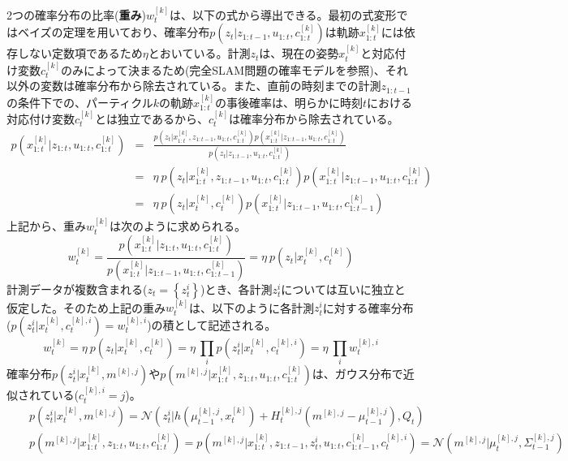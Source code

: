 \documentclass[dvipdfmx,a4paper]{jsarticle}
\begin{document}
2つの確率分布の比率(\textbf{重み})$w_t^{[k]}$は、以下の式から導出できる。最初の式変形ではベイズの定理を用いており、確率分布$p(z_t | z_{1 : t - 1}, u_{1 : t}, c_{1 : t}^{[k]})$は軌跡$x_{1 : t}^{[k]}$には依存しない定数項であるため$\eta$とおいている。計測$z_t$は、現在の姿勢$x_t^{[k]}$と対応付け変数$c_t^{[k]}$のみによって決まるため(完全SLAM問題の確率モデルを参照)、それ以外の変数は確率分布から除去されている。また、直前の時刻までの計測$z_{1 : t - 1}$の条件下での、パーティクル$k$の軌跡$x_{1 : t}^{[k]}$の事後確率は、明らかに時刻$t$における対応付け変数$c_t^{[k]}$とは独立であるから、$c_t^{[k]}$は確率分布から除去されている。
\begin{eqnarray}
	p(x_{1 : t}^{[k]} | z_{1 : t}, u_{1 : t}, c_{1 : t}^{[k]}) &=& \frac{p(z_t | x_{1 : t}^{[k]}, z_{1 : t - 1}, u_{1 : t}, c_{1 : t}^{[k]}) p(x_{1 : t}^{[k]} | z_{1 : t - 1}, u_{1 : t}, c_{1 : t}^{[k]})}{p(z_t | z_{1 : t - 1}, u_{1 : t}, c_{1 : t}^{[k]})} \nonumber \\
	&=& \eta \ p(z_t | x_{1 : t}^{[k]}, z_{1 : t - 1}, u_{1 : t}, c_{1 : t}^{[k]}) p(x_{1 : t}^{[k]} | z_{1 : t - 1}, u_{1 : t}, c_{1 : t}^{[k]}) \nonumber \\
	&=& \eta \ p(z_t | x_t^{[k]}, c_t^{[k]}) p(x_{1 : t}^{[k]} | z_{1 : t - 1}, u_{1 : t}, c_{1 : t - 1}^{[k]})
\end{eqnarray}
上記から、重み$w_t^{[k]}$は次のように求められる。
\begin{equation}
	w_t^{[k]} = \frac{p(x_{1 : t}^{[k]} | z_{1 : t}, u_{1 : t}, c_{1 : t}^{[k]})}{p(x_{1 : t}^{[k]} | z_{1 : t - 1}, u_{1 : t}, c_{1 : t - 1}^{[k]})} = \eta \ p(z_t | x_t^{[k]}, c_t^{[k]})
\end{equation}
計測データが複数含まれる($z_t = \left\{ z_t^i \right\}$)とき、各計測$z_t^i$については互いに独立と仮定した。そのため上記の重み$w_t^{[k]}$は、以下のように各計測$z_t^i$に対する確率分布($p(z_t^i | x_t^{[k]}, c_t^{[k], i}) = w_t^{[k], i}$)の積として記述される。
\begin{equation}
	w_t^{[k]} = \eta \ p(z_t | x_t^{[k]}, c_t^{[k]}) = \eta \ \prod_i p(z_t^i | x_t^{[k]}, c_t^{[k], i}) = \eta \ \prod_i w_t^{[k], i}
\end{equation}
確率分布$p(z_t^i | x_t^{[k]}, m^{[k], j})$や$p(m^{[k], j} | x_{1 : t}^{[k]}, z_{1 : t}, u_{1 : t}, c_{1 : t}^{[k]})$は、ガウス分布で近似されている($c_t^{[k], i} = j$)。
\begin{eqnarray}
	&& p(z_t^i | x_t^{[k]}, m^{[k], j}) = \mathcal{N} \left( z_t^i | h(\mu_{t - 1}^{[k], j}, x_t^{[k]}) + H_t^{[k], j} \left( m^{[k], j} - \mu_{t - 1}^{[k], j} \right), Q_t \right) \nonumber \\
	&& p(m^{[k], j} | x_{1 : t}^{[k]}, z_{1 : t}, u_{1 : t}, c_{1 : t}^{[k]}) = p(m^{[k], j} | x_{1 : t}^{[k]}, z_{1 : t - 1}, z_t^i, u_{1 : t}, c_{1 : t - 1}^{[k]}, c_t^{[k], i}) = \mathcal{N}(m^{[k], j} | \mu_t^{[k], j}, \Sigma_{t - 1}^{[k], j}) \nonumber
\end{eqnarray}
\end{document}
